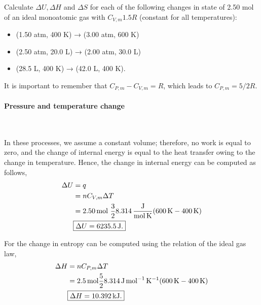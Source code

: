 \documentclass[main.tex]{subfiles}
\begin{document}
\subsection{~}
Calculate $\Delta U, \Delta H$ and $\Delta S$ for each of the following changes in state of 2.50 mol of an ideal monoatomic gas with $C_{V,m} 1.5R$ (constant for all temperatures):
\begin{itemize}
    \item (1.50 atm, 400 K) → (3.00 atm, 600 K)
    \item (2.50 atm, 20.0 L) → (2.00 atm, 30.0 L)
    \item (28.5 L, 400 K) → (42.0 L, 400 K).
\end{itemize}

It is important to remember that $C_{P,m}-C_{V,m} = R$, which leads to $C_{P,m} = 5/2 R$.

\paragraph{Pressure and temperature change}~

In these processes, we assume a constant volume; therefore, no work is equal to zero, and the change of internal energy is equal to the heat transfer owing to the change in temperature.
Hence, the change in internal energy can be computed as follows,
\begin{align*}
    \Delta U &= q \\
    &= nC_{V,m}\Delta T \\
    &= \SI{2.50}{\mol}~\frac{3}{2}\SI[per-mode=fraction]{8.314}{\joule\per\mole\per\kelvin}\qty(\SI{600}{\kelvin}-\SI{400}{\kelvin}) \\
    &\begin{gathered}
        \boxed{\Delta U = \SI{6235.5}{\joule}.}
    \end{gathered}
\end{align*}

For the change in entropy can be computed using the relation of the ideal gas law,
\begin{align*}
    \Delta H &= nC_{P,m}\Delta T \\
    &= \SI{2.5}{\mol}\frac{5}{2}\SI{8.314}{\joule\per\mol\per\kelvin}\qty(\SI{600}{\kelvin}-\SI{400}{\kelvin}) \\
    &\begin{gathered}
        \boxed{\Delta H = \SI{10.392}{\kilo\joule}.}
    \end{gathered}
\end{align*}
\end{document}
